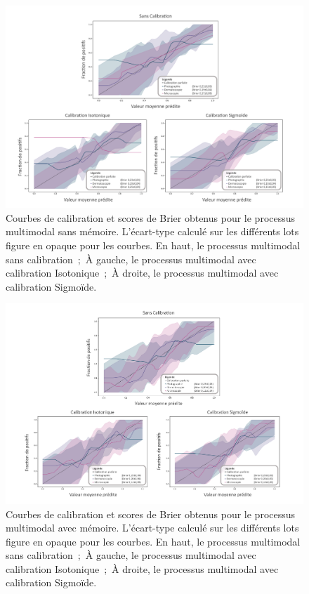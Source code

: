 \begin{landscape}
\begin{figure}[H]
    \centering
    \includegraphics[width=0.8\linewidth]{contents/chapter_8/resources/results_calibration_sequential.pdf}
    \caption{Courbes de calibration et scores de Brier obtenus pour le processus multimodal sans mémoire. L'écart-type calculé sur les différents lots figure en opaque pour les courbes. En haut, le processus multimodal sans calibration~;~À gauche, le processus multimodal avec calibration Isotonique~;~À droite, le processus multimodal avec calibration Sigmoïde.}
    \label{fig:results_calibration_sequential}
\end{figure}
\end{landscape}

\begin{landscape}
\begin{figure}[H]
    \centering
    \includegraphics[width=0.8\linewidth]{contents/chapter_8/resources/results_calibration_cumulative.pdf}
    \caption{Courbes de calibration et scores de Brier obtenus pour le processus multimodal avec mémoire. L'écart-type calculé sur les différents lots figure en opaque pour les courbes. En haut, le processus multimodal sans calibration~;~À gauche, le processus multimodal avec calibration Isotonique~;~À droite, le processus multimodal avec calibration Sigmoïde.}
    \label{fig:results_calibration_cumulative}
\end{figure}
\end{landscape}

